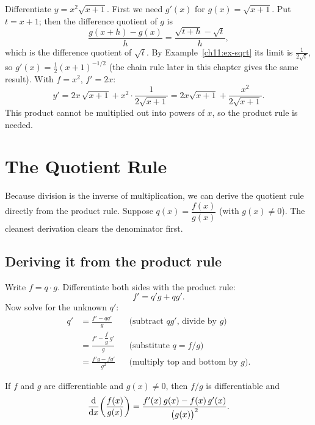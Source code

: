 \begin{example}\label{ch11:ex-prod2}
Differentiate $y = x^2 \sqrt{x+1}$. First we need $g'(x)$ for $g(x)=\sqrt{x+1}$. Put
$t=x+1$; then the difference quotient of $g$ is
\[
  \frac{g(x+h)-g(x)}{h} = \frac{\sqrt{t+h}-\sqrt{t}}{h},
\]
which is the difference quotient of $\sqrt{t}$. By
Example~\ref{ch11:ex-sqrt} its limit is $\frac{1}{2\sqrt t}$, so
$g'(x) = \tfrac12 (x+1)^{-1/2}$ (the chain rule later in this chapter gives the same
result). With $f=x^2$, $f'=2x$:
\[
  y' = 2x\,\sqrt{x+1} + x^2\cdot\frac{1}{2\sqrt{x+1}}
     = 2x\sqrt{x+1} + \frac{x^2}{2\sqrt{x+1}} .
\]
This product cannot be multiplied out into powers of $x$, so the product rule is needed.
\end{example}

\section{The Quotient Rule}
\label{ch11:quotient-rule}

Because division is the inverse of multiplication, we can derive the quotient rule directly from
the product rule. Suppose $q(x) = \dfrac{f(x)}{g(x)}$ (with $g(x)\ne 0$). The cleanest
derivation clears the denominator first.

\subsection{Deriving it from the product rule}

Write $f = q\cdot g$. Differentiate both sides with the product rule:
\[
  f' = q' g + q g'.
\]
Now solve for the unknown $q'$:
\begin{align*}
  q' &= \frac{f' - q g'}{g} && \text{(subtract $qg'$, divide by $g$)} \\
     &= \frac{f' - \dfrac{f}{g}\,g'}{g} && \text{(substitute $q=f/g$)} \\
     &= \frac{f' g - f g'}{g^2} && \text{(multiply top and bottom by $g$).}
\end{align*}

\begin{theorem}\label{ch11:thm-quotient}
If $f$ and $g$ are differentiable and $g(x)\ne 0$, then $f/g$ is differentiable and
\[
  \frac{\mathrm{d}}{\mathrm{d} x}\!\left(\frac{f(x)}{g(x)}\right)
  = \frac{f'(x)\,g(x) - f(x)\,g'(x)}{\big(g(x)\big)^2}.
\]
\end{theorem}

